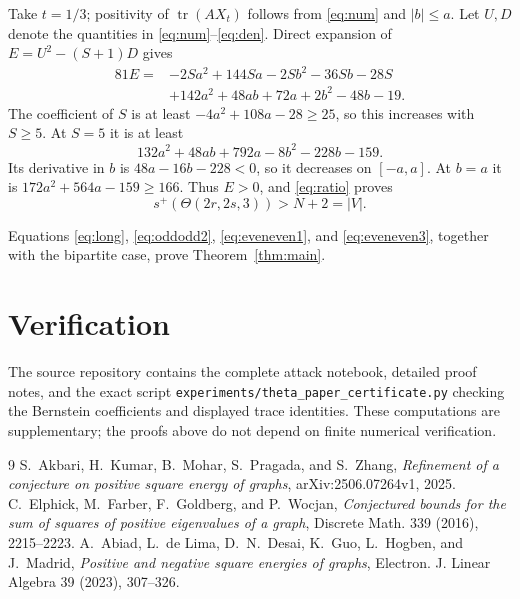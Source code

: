 \documentclass[11pt]{article}
\begin{document}
Take $t=1/3$; positivity of $\operatorname{tr}(AX_t)$ follows from
\eqref{eq:num} and $|b|\le a$.  Let $U,D$ denote the quantities in
\eqref{eq:num}--\eqref{eq:den}.  Direct expansion of
$E=U^2-(S+1)D$ gives
\begin{align*}
81E={}&-2Sa^2+144Sa-2Sb^2-36Sb-28S\\
&+142a^2+48ab+72a+2b^2-48b-19.
\end{align*}
The coefficient of $S$ is at least $-4a^2+108a-28\ge25$, so this increases
with $S\ge5$.  At $S=5$ it is at least
\[
132a^2+48ab+792a-8b^2-228b-159.
\]
Its derivative in $b$ is $48a-16b-228<0$, so it decreases on $[-a,a]$.
At $b=a$ it is
$172a^2+564a-159\ge166$.  Thus $E>0$, and \eqref{eq:ratio} proves
\begin{equation}\label{eq:eveneven3}
 s^+(\Theta(2r,2s,3))>N+2=|V|.
\end{equation}

Equations \eqref{eq:long}, \eqref{eq:oddodd2},
\eqref{eq:eveneven1}, and \eqref{eq:eveneven3}, together with the bipartite
case, prove Theorem~\ref{thm:main}.

\section{Verification}
The source repository contains the complete attack notebook, detailed proof
notes, and the exact script \texttt{experiments/theta\_paper\_certificate.py}
checking the Bernstein coefficients and displayed trace identities.  These
computations are supplementary; the proofs above do not depend on finite
numerical verification.

\begin{thebibliography}{9}
S.~Akbari, H.~Kumar, B.~Mohar, S.~Pragada, and S.~Zhang,
\emph{Refinement of a conjecture on positive square energy of graphs},
arXiv:2506.07264v1, 2025.
C.~Elphick, M.~Farber, F.~Goldberg, and P.~Wocjan,
\emph{Conjectured bounds for the sum of squares of positive eigenvalues of a
graph}, Discrete Math. 339 (2016), 2215--2223.
A.~Abiad, L.~de Lima, D.~N.~Desai, K.~Guo, L.~Hogben, and J.~Madrid,
\emph{Positive and negative square energies of graphs}, Electron. J. Linear
Algebra 39 (2023), 307--326.
\end{thebibliography}
\end{document}
